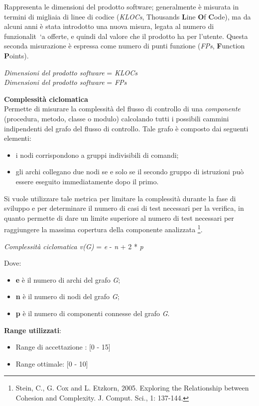 Rappresenta le dimensioni del prodotto software; generalmente \`e misurata in termini di migliaia di linee di codice (\textit{KLOCs}, Thousands \textbf{L}ine \textbf{O}f \textbf{C}ode), ma da alcuni anni \`e stata introdotto una nuova misura, legata al numero di funzionalit\ `a offerte, e quindi dal valore che il prodotto ha per l'utente. Questa seconda misurazione \`e espressa come numero di punti funzione (\textit{FPs}, \textbf{F}unction \textbf{P}oints). \\
\begin{center}
	\textit{Dimensioni del prodotto software} = \textit{KLOCs} \\
	\textit{Dimensioni del prodotto software} = \textit{FPs} 
\end{center}

\textbf{Complessit\`a ciclomatica}\\

Permette di misurare la complessit\`a del flusso di controllo di una \textit{componente} (procedura, metodo, classe o modulo) calcolando tutti i possibili cammini indipendenti del grafo del flusso di controllo. Tale grafo \`e composto dai seguenti elementi:
\begin{itemize}
	\item i nodi corrispondono a gruppi indivisibili di comandi;
	\item gli archi collegano due nodi se e solo se il secondo gruppo di istruzioni pu\`o essere eseguito immediatamente dopo il primo.
\end{itemize}
Si vuole utilizzare tale metrica per limitare la complessit\`a durante la fase di sviluppo e per determinare il numero di casi di test necessari per la verifica, in quanto permette di dare un limite superiore al numero di test necessari per raggiungere la massima copertura della componente analizzata \footnote{Stein, C., G. Cox and L. Etzkorn, 2005. Exploring the Relationship between Cohesion and Complexity. J. Comput. Sci., 1: 137-144.}.
\begin{center}
	\textit{Complessit\`a ciclomatica v(G)} = \textit{e} - \textit{n} + 2 * \textit{p}
\end{center}
Dove:
\begin{itemize}
	\item \textbf{e} \`e il numero di archi del grafo \textit{G};
	\item \textbf{n} \`e il numero di nodi del grafo \textit{G};
	\item \textbf{p} \`e il numero di componenti connesse del grafo \textit{G}.
\end{itemize}
\textbf{Range utilizzati}:
\begin{itemize}
	\item Range di accettazione : [0 - 15]
	\item Range ottimale: [0 - 10]
\end{itemize}

